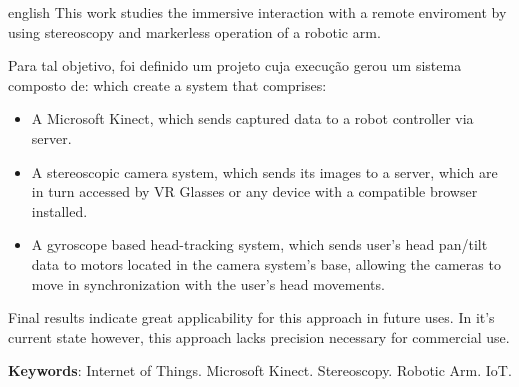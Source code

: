 \begin{resumo}[Abstract]
	\begin{otherlanguage*}{english}
		This work studies the immersive interaction with a remote enviroment by using stereoscopy and markerless operation of a robotic arm.


Para tal objetivo, foi definido um projeto cuja execução gerou um sistema composto de:
which create a system that comprises:
\begin{itemize}
	\item A Microsoft Kinect, which sends captured data to a robot controller via server.
	\item A stereoscopic camera system, which sends its images to a server, which are in turn accessed by VR Glasses or any device with a compatible browser installed.
	\item A gyroscope based head-tracking system, which sends user's head pan/tilt data to motors located in the camera system's base, allowing the cameras to move in synchronization with the user's head movements.		
\end{itemize}
Final results indicate great applicability for this approach in future uses. In it's current state however, this approach lacks precision necessary for commercial use.
	
		\vspace{\onelineskip}
		
		\noindent 
		\textbf{Keywords}: Internet of Things. Microsoft Kinect. Stereoscopy.  Robotic Arm. IoT. 
	\end{otherlanguage*}
\end{resumo}